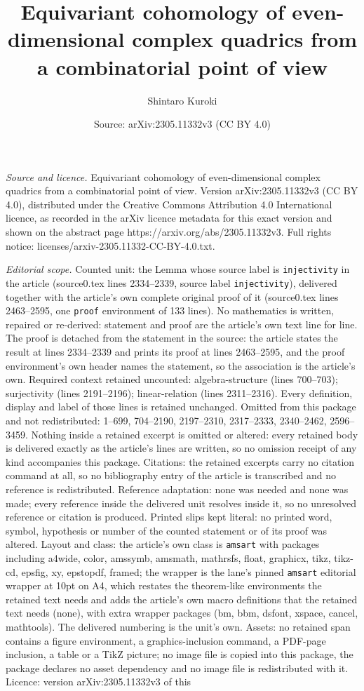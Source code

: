 \documentclass[10pt,a4paper]{amsart}
\title[Equivariant cohomology of even-dimensional complex quadrics ]{Equivariant cohomology of even-dimensional complex quadrics from a combinatorial point of view}
\author{Shintaro Kuroki}
\date{Source: arXiv:2305.11332v3 (CC BY 4.0)}
\begin{document}
\maketitle

\noindent\emph{Source and licence.} Equivariant cohomology of even-dimensional complex quadrics from a combinatorial point of view. Version arXiv:2305.11332v3 (CC BY 4.0), distributed under the Creative Commons Attribution 4.0 International licence, as recorded in the arXiv licence metadata for this exact version and shown on the abstract page https://arxiv.org/abs/2305.11332v3. Full rights notice: licenses/arxiv-2305.11332-CC-BY-4.0.txt.\par\smallskip

\noindent\textit{Editorial scope.} Counted unit: the Lemma whose source label is \texttt{injectivity} in the article (source0.tex lines 2334--2339, source label \texttt{injectivity}), delivered together with the article's own complete original proof of it (source0.tex lines 2463--2595, one \texttt{proof} environment of 133 lines). No mathematics is written, repaired or re-derived: statement and proof are the article's own text line for line. The proof is detached from the statement in the source: the article states the result at lines 2334--2339 and prints its proof at lines 2463--2595, and the proof environment's own header names the statement, so the association is the article's own. Required context retained uncounted: algebra-structure (lines 700--703); surjectivity (lines 2191--2196); linear-relation (lines 2311--2316). Every definition, display and label of those lines is retained unchanged. Omitted from this package and not redistributed: 1--699, 704--2190, 2197--2310, 2317--2333, 2340--2462, 2596--3459. Nothing inside a retained excerpt is omitted or altered: every retained body is delivered exactly as the article's lines are written, so no omission receipt of any kind accompanies this package. Citations: the retained excerpts carry no citation command at all, so no bibliography entry of the article is transcribed and no reference is redistributed. Reference adaptation: none was needed and none was made; every reference inside the delivered unit resolves inside it, so no unresolved reference or citation is produced. Printed slips kept literal: no printed word, symbol, hypothesis or number of the counted statement or of its proof was altered. Layout and class: the article's own class is \texttt{amsart} with packages including a4wide, color, amssymb, amsmath, mathrsfs, float, graphicx, tikz, tikz-cd, epsfig, xy, epstopdf, framed; the wrapper is the lane's pinned \texttt{amsart} editorial wrapper at 10pt on A4, which restates the theorem-like environments the retained text needs and adds the article's own macro definitions that the retained text needs (none), with extra wrapper packages (bm, bbm, dsfont, xspace, cancel, mathtools). The delivered numbering is the unit's own. Assets: no retained span contains a figure environment, a graphics-inclusion command, a PDF-page inclusion, a table or a TikZ picture; no image file is copied into this package, the package declares no asset dependency and no image file is redistributed with it. Licence: version arXiv:2305.11332v3 of this 
\end{document}
